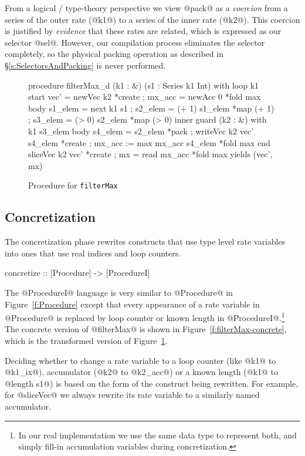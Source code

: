 From a logical / type-theory perspective we view @pack@ as a \emph{coercion} from a series of the outer rate (@k1@) to a series of the inner rate (@k2@). This coercion is justified by \emph{evidence} that these rates are related, which is expressed as our selector @sel@. However, our compilation process eliminates the selector completely, so the physical packing operation as described in \S\ref{s:SelectorsAndPacking} is never performed.


\begin{figure}
\begin{code}
procedure filterMax_d (k1 : &) (s1 : Series k1 Int)
with loop k1
 start { vec'     = newVec k2             *create
       ; mx_acc   = newAcc 0       }      *fold max
 body  { s1_elem  = next k1 s1
       ; s2_elem  = (+ 1) s1_elem         *map (+ 1)
       ; s3_elem  = (> 0) s2_elem  }      *map (> 0)
 inner guard (k2 : &) with k1 s3_elem
       body { s4_elem = s2_elem           *pack
            ; writeVec k2 vec' s4_elem    *create
            ; mx_acc := max mx_acc s4_elem} *fold max
 end   { sliceVec k2 vec'                 *create
       ; mx       = read mx_acc }         *fold max
yields (vec', mx)
\end{code}
\caption{Procedure for \texttt{filterMax}}
\label{f:filterMax-nest}
\end{figure}


\subsection{Concretization}
\label{s:Concretization}
The concretization phase rewrites constructs that use type level rate variables into ones that use real indices and loop counters. 
\begin{code}
  concretize :: [Procedure] -> [ProcedureI]
\end{code}

The @ProcedureI@ language is very similar to @Procedure@ in Figure~\ref{f:Procedure} except that every appearance of a rate variable in @Procedure@ is replaced by loop counter or known length in @ProcedureI@.\footnote{In our real implementation we use the same data type to represent both, and simply fill-in accumulation variables during concretization.} The concrete version of @filterMax@ is shown in Figure~\ref{f:filterMax-concrete}, which is the transformed version of Figure~\ref{f:filterMax-nest}. 

Deciding whether to change a rate variable to a loop counter (like @k1@ to @k1_ix@), accumulator (@k2@ to @k2_acc@) or a known length (@k1@ to @length s1@) is based on the form of the construct being rewritten. For example, for @sliceVec@ we always rewrite its rate variable to a similarly named accumulator.

